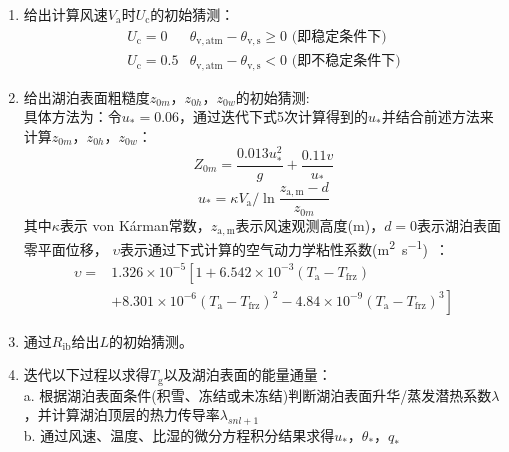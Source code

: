 \begin{enumerate}
  \item 给出计算风速$V_{\mathrm {a}} $时$U_{\mathrm {c}} $的初始猜测：
    \begin{equation}
      \begin{array}{ll}
        U_{\mathrm{c}}=0 & \theta_{\mathrm{v, atm}}-\theta_{\mathrm{v, s}} \geqslant 0 \text{ (即稳定条件下)} \\
        U_{\mathrm{c}}=0.5 & \theta_{\mathrm{v, atm}}-\theta_{\mathrm{v, s}}<0 \text{ (即不稳定条件下)}
      \end{array}
    \end{equation}
  \item 给出湖泊表面粗糙度$z_{0m}$，$z_{0h}$，$z_{0w}$的初始猜测:\\
    具体方法为：令$u_\ast=0.06$，通过迭代下式5次计算得到的$u_\ast$并结合前述方法来计算$z_{0m}$，$z_{0h}$，$z_{0w}$：
    \begin{equation}
      Z_{0 m}=\frac{0.013 u_{*}^{2}}{g}+\frac{0.11 v}{u_{*}}
    \end{equation}
    \begin{equation}
      u_{*}=\kappa V_{\mathrm{a}} / \ln \frac{z_{\mathrm{a, m}}-d}{z_{0 m}}
    \end{equation}
    其中$\kappa$表示 von K\'arman常数，$z_{\mathrm{a,m}}$表示风速观测高度(m)，$d=0$表示湖泊表面零平面位移，
    $\upsilon$表示通过下式计算的空气动力学粘性系数(\unit{m^2.s^{-1}})~\citep{andreas1989thermal}：
    \begin{equation}
      \begin{array}{cl}
        \upsilon=&1.326\times{10}^{-5}\left[1+6.542\times{10}^{-3}\left(T_{\mathrm{a}}-T_{\mathrm {frz}} \right)\right.\\
        & \left. +8.301\times{10}^{-6}\left(T_{\mathrm{a}}-T_{\mathrm {frz}} \right)^2-4.84\times{10}^{-9}\left(T_{\mathrm{a}}-T_{\mathrm {frz}} \right)^3\right]
      \end{array}
    \end{equation}
  \item 通过$R_{\mathrm{ib}}$给出$L$的初始猜测。
  \item 迭代以下过程以求得$T_{\mathrm {g}} $以及湖泊表面的能量通量：\\
    a. 根据湖泊表面条件(积雪、冻结或未冻结)判断湖泊表面升华/蒸发潜热系数$\lambda$，并计算湖泊顶层的热力传导率$\lambda_{snl+1}$ \\
    b. 通过风速、温度、比湿的微分方程积分结果求得$u_\ast$，$\theta_\ast$，$q_\ast$ \\

\end{enumerate}

